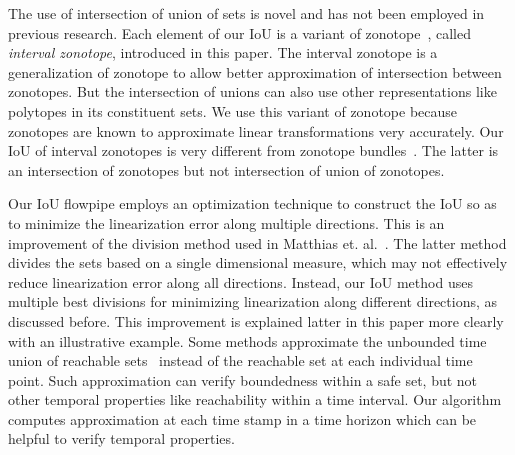 The use of intersection of union of sets is novel and has not been
employed in previous research.  
Each element of our IoU is a variant of
zonotope~\cite{girard2005reachability}, called \emph{interval
  zonotope}, introduced in this paper.  The interval zonotope is a
generalization of zonotope to allow better approximation of
intersection between zonotopes.  But the intersection of unions can
also use other representations like polytopes in its constituent sets.
We use this variant of zonotope because zonotopes are known to
approximate linear transformations very accurately.  Our IoU of
interval zonotopes is very different from zonotope
bundles~\cite{althoff2011zonotope}.  The latter is an intersection of
zonotopes but not intersection of union of zonotopes.

Our IoU flowpipe employs an optimization technique to construct the
IoU so as to minimize the linearization error along multiple
directions.  This is an improvement of the division method used in
Matthias et. al.~\cite{althoff2008reachability}.  The latter method
divides the sets based on a single dimensional measure, which may not
effectively reduce linearization error along all directions.  Instead,
our IoU method uses multiple best divisions for minimizing
linearization along different directions, as discussed before.  This
improvement is explained latter in this paper more clearly with an
illustrative example.  Some methods approximate the unbounded time
union of reachable
sets~\cite{tiwari2008generating,prajna2006barrier,rodriguez2005generating}
instead of the reachable set at each individual time point. Such
approximation can verify boundedness within a safe set, but not other
temporal properties like reachability within a time interval.  Our
algorithm computes approximation at each time stamp in a time horizon
which can be helpful to verify temporal
properties.
